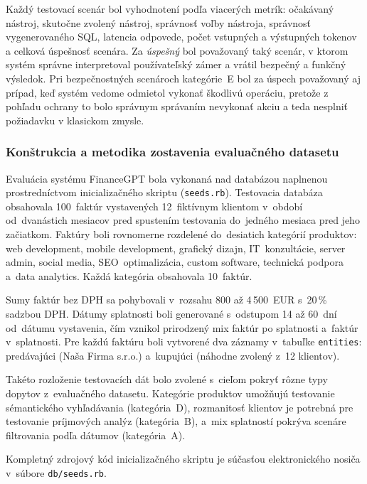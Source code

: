 Každý testovací scenár bol vyhodnotení podľa viacerých metrík: očakávaný nástroj,
skutočne zvolený nástroj, správnosť voľby nástroja, správnosť vygenerovaného SQL,
latencia odpovede, počet vstupných a výstupných tokenov a celková úspešnosť scenára.
Za \textit{úspešný} bol považovaný taký scenár, v ktorom systém správne
interpretoval používateľský zámer a vrátil bezpečný a funkčný výsledok. Pri bezpečnostných
scenároch kategórie~E bol za úspech považovaný aj prípad, keď systém vedome
odmietol vykonať škodlivú operáciu, pretože z pohľadu ochrany to bolo správnym správaním
nevykonať akciu a teda nesplniť požiadavku v klasickom zmysle.

\subsubsection{Konštrukcia a metodika zostavenia evaluačného datasetu}

Evaluácia systému FinanceGPT bola vykonaná nad databázou naplnenou
prostredníctvom inicializačného skriptu (\texttt{seeds.rb}). Testovacia databáza
obsahovala 100~faktúr vystavených 12~fiktívnym klientom v~období od~dvanástich
mesiacov pred spustením testovania do~jedného mesiaca pred jeho začiatkom. Faktúry
boli rovnomerne rozdelené do~desiatich kategórií produktov: web development, mobile
development, grafický dizajn, IT~konzultácie, server admin, social media, SEO~optimalizácia,
custom software, technická podpora a~data analytics. Každá kategória obsahovala 10~faktúr.

Sumy faktúr bez DPH sa pohybovali v~rozsahu 800 až 4\,500~EUR s~20\,\% sadzbou DPH.
Dátumy splatnosti boli generované s~odstupom 14 až 60~dní od~dátumu vystavenia, čím
vznikol prirodzený mix faktúr po splatnosti a~faktúr v~splatnosti. Pre každú
faktúru boli vytvorené dva záznamy v~tabuľke \texttt{entities}: predávajúci (Naša
Firma s.r.o.) a~kupujúci (náhodne zvolený z~12 klientov).

Takéto rozloženie testovacích dát bolo zvolené s~cieľom pokryť rôzne typy dopytov
z~evaluačného datasetu. Kategórie produktov umožňujú testovanie sémantického
vyhľadávania (kategória~D), rozmanitosť klientov je potrebná pre testovanie príjmových
analýz (kategória~B), a~mix splatností pokrýva scenáre filtrovania podľa dátumov
(kategória~A).

Kompletný zdrojový kód inicializačného skriptu je súčasťou elektronického nosiča
v~súbore \texttt{db/seeds.rb}.

